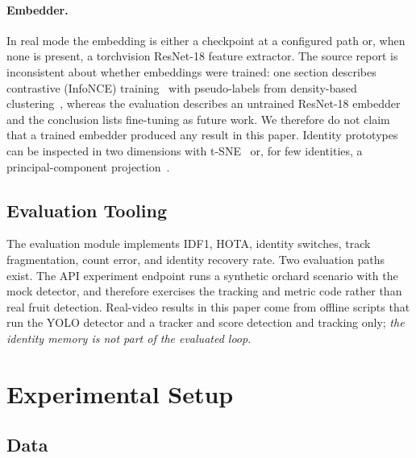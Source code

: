 \documentclass[11pt]{article}
\newif\ifnotes  \notesfalse
\newcommand{\authorcheck}[1]{\ifnotes{\color{red}\textbf{[Author check:} #1\textbf{]}}\fi}
\begin{document}
\paragraph{Embedder.} In real mode the embedding is either a checkpoint at a configured path or, when none is present, a torchvision ResNet-18 feature extractor. The source report is inconsistent about whether embeddings were trained: one section describes contrastive (InfoNCE) training~\cite{reddi2017} with pseudo-labels from density-based clustering~\cite{ester1996}, whereas the evaluation describes an untrained ResNet-18 embedder and the conclusion lists fine-tuning as future work. We therefore do not claim that a trained embedder produced any result in this paper. \authorcheck{state which embedder was used in each experiment, and whether the InfoNCE training described in the source was actually run. Also verify the citation \texttt{reddi2017} as the source for the InfoNCE loss; I could not confirm it from the supplied material.} Identity prototypes can be inspected in two dimensions with t-SNE~\cite{vandermaaten2008} or, for few identities, a principal-component projection~\cite{jolliffe2016}.

\subsection{Evaluation Tooling}

The evaluation module implements IDF1, HOTA, identity switches, track fragmentation, count error, and identity recovery rate. Two evaluation paths exist. The API experiment endpoint runs a synthetic orchard scenario with the mock detector, and therefore exercises the tracking and metric code rather than real fruit detection. Real-video results in this paper come from offline scripts that run the YOLO detector and a tracker and score detection and tracking only; \emph{the identity memory is not part of the evaluated loop}.

\section{Experimental Setup}
\label{sec:setup}

\subsection{Data}
\end{document}
